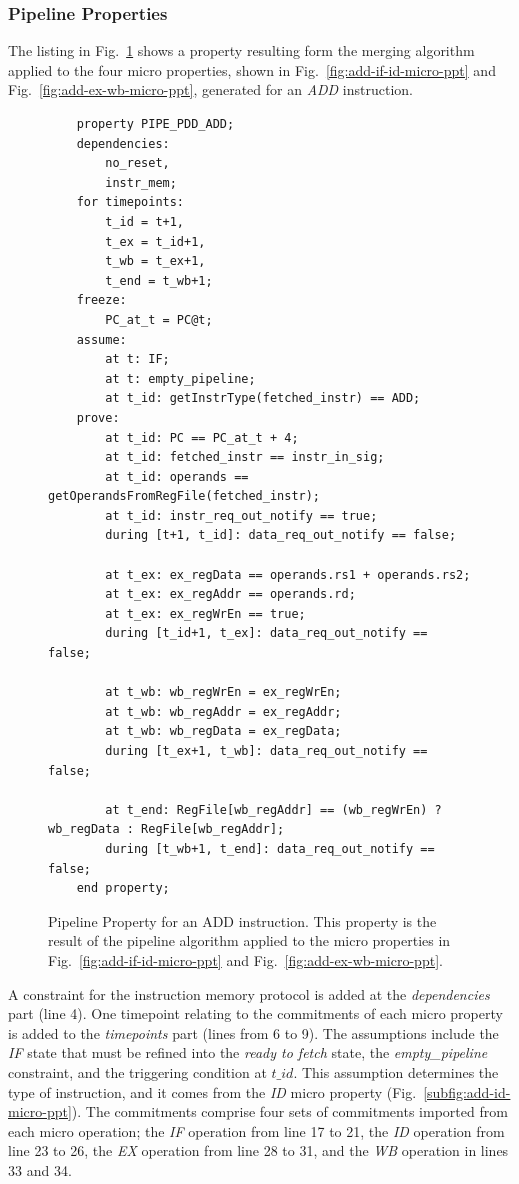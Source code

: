 \subsubsection*{Pipeline Properties}

The listing in Fig.~\ref{fig:add-ptt-merg-algorithm} shows a property resulting form the merging algorithm applied to the four micro properties, shown in Fig.~\ref{fig:add-if-id-micro-ppt} and Fig.~\ref{fig:add-ex-wb-micro-ppt}, generated for an \textit{ADD} instruction.

\begin{figure}[htb!]
    \begin{lstlisting}
    property PIPE_PDD_ADD;
    dependencies: 
        no_reset,
        instr_mem;
    for timepoints:
        t_id = t+1,
        t_ex = t_id+1,
        t_wb = t_ex+1,
        t_end = t_wb+1;
    freeze:
        PC_at_t = PC@t;
    assume:
        at t: IF;
        at t: empty_pipeline;
        at t_id: getInstrType(fetched_instr) == ADD;
    prove:
        at t_id: PC == PC_at_t + 4;
        at t_id: fetched_instr == instr_in_sig;
        at t_id: operands == getOperandsFromRegFile(fetched_instr);
        at t_id: instr_req_out_notify == true;
        during [t+1, t_id]: data_req_out_notify == false;
    
        at t_ex: ex_regData == operands.rs1 + operands.rs2;
        at t_ex: ex_regAddr == operands.rd;
        at t_ex: ex_regWrEn == true;
        during [t_id+1, t_ex]: data_req_out_notify == false;
    
        at t_wb: wb_regWrEn = ex_regWrEn;
        at t_wb: wb_regAddr = ex_regAddr;
        at t_wb: wb_regData = ex_regData;
        during [t_ex+1, t_wb]: data_req_out_notify == false;
    
        at t_end: RegFile[wb_regAddr] == (wb_regWrEn) ? wb_regData : RegFile[wb_regAddr];
        during [t_wb+1, t_end]: data_req_out_notify == false;
    end property;\end{lstlisting}
    \caption{Pipeline Property for an ADD instruction. This property is the result of the pipeline algorithm applied to the micro properties in Fig.~\ref{fig:add-if-id-micro-ppt} and Fig.~\ref{fig:add-ex-wb-micro-ppt}.}
    \label{fig:add-ptt-merg-algorithm}
\end{figure}

A constraint for the instruction memory protocol is added at the \textit{dependencies} part (line 4). One timepoint relating to the commitments of each micro property is added to the \textit{timepoints} part (lines from 6 to 9). The assumptions include the \textit{IF} state that must be refined into the \textit{ready to fetch} state, the \textit{empty\_pipeline} constraint, and the triggering condition at $t\_id$. This assumption determines the type of instruction, and it comes from the \textit{ID} micro property (Fig.~\ref{subfig:add-id-micro-ppt}). The commitments comprise four sets of commitments imported from each micro operation; the \textit{IF} operation from line 17 to 21, the \textit{ID} operation from line 23 to 26, the \textit{EX} operation from line 28 to 31, and the \textit{WB} operation in lines 33 and 34.

